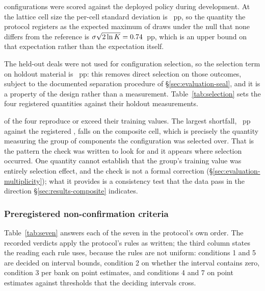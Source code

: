 \vsevenSelK{} configurations were scored against the deployed policy during development. At the
lattice cell size the per-cell standard deviation is \vsevenSelSigma{}~pp, so the quantity the protocol registers as the expected maximum of
\vsevenSelK{} draws under the null that none differs from the reference is
$\sigma\sqrt{2\ln K} = 0.74{}$~pp, which is an upper bound on that
expectation rather than the expectation itself.

The held-out deals were not used for configuration selection, so the selection term on holdout
material is \vsevenSelOnHoldout{}~pp: this removes direct selection on those outcomes, subject to
the documented separation procedure of \S\ref{sec:evaluation-seal}, and it is a property of the
design rather than a measurement.
Table~\ref{tab:selection} sets the four registered quantities against their holdout measurements.

\begin{table}[!ht]\centering
\caption{The four quantities the registered selection check tabulates, against their holdout
measurements. Three reproduce or exceed; one falls short. These are not every figure the protocol
states in advance, and two of the partner-regime predictions in \S\ref{sec:results-partners} also
come in low.}
\label{tab:selection}
{\tabfont}
\end{table}

\vsevenSelReproduce{} of the four reproduce or exceed their training values. The largest shortfall,
\vsevenSelWorstShortfall{}~pp against the registered \vsevenSelExpectedMax{},
falls on the composite cell, which is precisely the quantity measuring the group of components the
configuration was selected over. That is the pattern the check was written to look for and it appears
where selection occurred. One quantity cannot establish that the group's training value was entirely
selection effect, and the check is not a formal correction
(\S\ref{sec:evaluation-multiplicity}); what it provides is a consistency test that the data pass in
the direction \S\ref{sec:results-composite} indicates.

\subsubsection{Preregistered non-confirmation criteria}
\label{sec:results-seven}

Table~\ref{tab:seven} answers each of the seven in the protocol's own order. The recorded verdicts
apply the protocol's rules as written; the third column states the reading each rule uses, because
the rules are not uniform: conditions 1 and 5 are decided on interval bounds, condition 2 on whether
the interval contains zero, condition 3 per bank on point estimates, and conditions 4 and 7 on point
estimates against thresholds that the deciding intervals cross.

